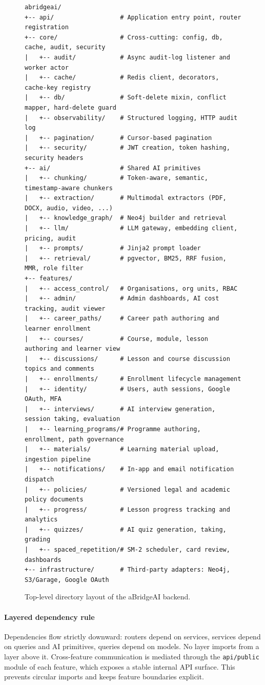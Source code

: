 \begin{figure}[H]
\centering
\begin{verbatim}
abridgeai/
+-- api/                  # Application entry point, router registration
+-- core/                 # Cross-cutting: config, db, cache, audit, security
|   +-- audit/            # Async audit-log listener and worker actor
|   +-- cache/            # Redis client, decorators, cache-key registry
|   +-- db/               # Soft-delete mixin, conflict mapper, hard-delete guard
|   +-- observability/    # Structured logging, HTTP audit log
|   +-- pagination/       # Cursor-based pagination
|   +-- security/         # JWT creation, token hashing, security headers
+-- ai/                   # Shared AI primitives
|   +-- chunking/         # Token-aware, semantic, timestamp-aware chunkers
|   +-- extraction/       # Multimodal extractors (PDF, DOCX, audio, video, ...)
|   +-- knowledge_graph/  # Neo4j builder and retrieval
|   +-- llm/              # LLM gateway, embedding client, pricing, audit
|   +-- prompts/          # Jinja2 prompt loader
|   +-- retrieval/        # pgvector, BM25, RRF fusion, MMR, role filter
+-- features/
|   +-- access_control/   # Organisations, org units, RBAC
|   +-- admin/            # Admin dashboards, AI cost tracking, audit viewer
|   +-- career_paths/     # Career path authoring and learner enrollment
|   +-- courses/          # Course, module, lesson authoring and learner view
|   +-- discussions/      # Lesson and course discussion topics and comments
|   +-- enrollments/      # Enrollment lifecycle management
|   +-- identity/         # Users, auth sessions, Google OAuth, MFA
|   +-- interviews/       # AI interview generation, session taking, evaluation
|   +-- learning_programs/# Programme authoring, enrollment, path governance
|   +-- materials/        # Learning material upload, ingestion pipeline
|   +-- notifications/    # In-app and email notification dispatch
|   +-- policies/         # Versioned legal and academic policy documents
|   +-- progress/         # Lesson progress tracking and analytics
|   +-- quizzes/          # AI quiz generation, taking, grading
|   +-- spaced_repetition/# SM-2 scheduler, card review, dashboards
+-- infrastructure/       # Third-party adapters: Neo4j, S3/Garage, Google OAuth
\end{verbatim}
\caption{Top-level directory layout of the aBridgeAI backend.}
\label{fig:project_structure}
\end{figure}

\paragraph{Layered dependency rule}
Dependencies flow strictly downward: routers depend on services, services depend on queries and AI primitives, queries depend on models. No layer imports from a layer above it. Cross-feature communication is mediated through the \texttt{api/public} module of each feature, which exposes a stable internal API surface. This prevents circular imports and keeps feature boundaries explicit.

